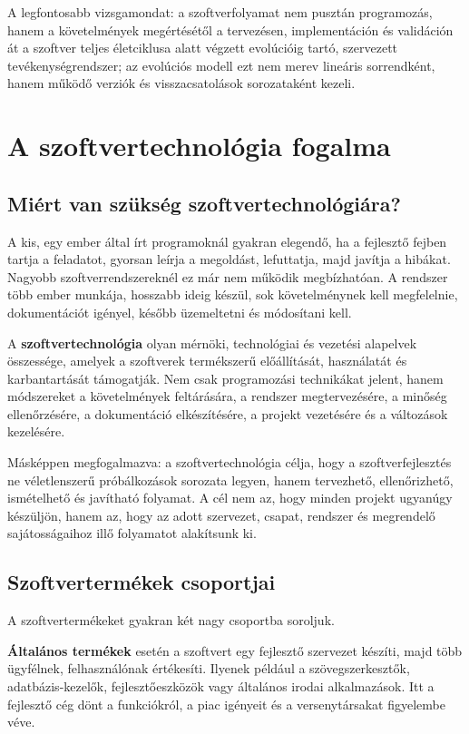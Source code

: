 A legfontosabb vizsgamondat: a szoftverfolyamat nem pusztán programozás, hanem a követelmények megértésétől a tervezésen, implementáción és validáción át a szoftver teljes életciklusa alatt végzett evolúcióig tartó, szervezett tevékenységrendszer; az evolúciós modell ezt nem merev lineáris sorrendként, hanem működő verziók és visszacsatolások sorozataként kezeli.

\section{A szoftvertechnológia fogalma}

\subsection{Miért van szükség szoftvertechnológiára?}

A kis, egy ember által írt programoknál gyakran elegendő, ha a fejlesztő fejben tartja a feladatot, gyorsan leírja a megoldást, lefuttatja, majd javítja a hibákat. Nagyobb szoftverrendszereknél ez már nem működik megbízhatóan. A rendszer több ember munkája, hosszabb ideig készül, sok követelménynek kell megfelelnie, dokumentációt igényel, később üzemeltetni és módosítani kell.

A \textbf{szoftvertechnológia} olyan mérnöki, technológiai és vezetési alapelvek összessége, amelyek a szoftverek termékszerű előállítását, használatát és karbantartását támogatják. Nem csak programozási technikákat jelent, hanem módszereket a követelmények feltárására, a rendszer megtervezésére, a minőség ellenőrzésére, a dokumentáció elkészítésére, a projekt vezetésére és a változások kezelésére.

Másképpen megfogalmazva: a szoftvertechnológia célja, hogy a szoftverfejlesztés ne véletlenszerű próbálkozások sorozata legyen, hanem tervezhető, ellenőrizhető, ismételhető és javítható folyamat. A cél nem az, hogy minden projekt ugyanúgy készüljön, hanem az, hogy az adott szervezet, csapat, rendszer és megrendelő sajátosságaihoz illő folyamatot alakítsunk ki.

\subsection{Szoftvertermékek csoportjai}

A szoftvertermékeket gyakran két nagy csoportba soroljuk.

\textbf{Általános termékek} esetén a szoftvert egy fejlesztő szervezet készíti, majd több ügyfélnek, felhasználónak értékesíti. Ilyenek például a szövegszerkesztők, adatbázis-kezelők, fejlesztőeszközök vagy általános irodai alkalmazások. Itt a fejlesztő cég dönt a funkciókról, a piac igényeit és a versenytársakat figyelembe véve.

